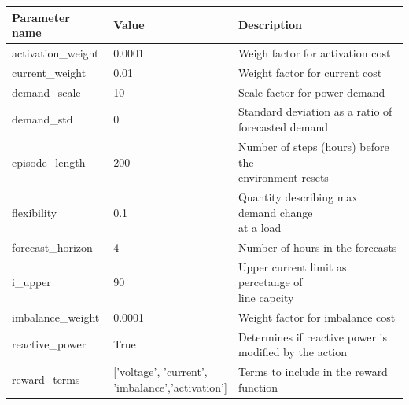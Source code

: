 \documentclass[class=book, crop=false]{standalone}
\begin{document}
{
\renewcommand{\arraystretch}{1.5}
\begin{table}[ht]
\center
\begin{tabular}{lll}
Parameter name     & Value                                                & Description                                                  \\
\hline
activation\_weight & 0.0001                                               & Weigh factor for activation cost                             \\
current\_weight    & 0.01                                                 & Weight factor for current cost                               \\
demand\_scale      & 10                                                   & Scale factor for power demand                                \\
demand\_std        & 0                                                    & \makecell[l]{Standard deviation as a ratio of \\ forecasted demand}           \\
episode\_length    & 200                                                  & \makecell[l]{Number of steps (hours) before the \\ environment resets}        \\
flexibility        & 0.1                                                  & \makecell[l]{Quantity describing  max demand change \\ at a load}              \\
forecast\_horizon  & 4                                                    & Number of hours in the forecasts                             \\
i\_upper           & 90                                                   & \makecell[l]{Upper current limit as percetange of \\line capcity}            \\
imbalance\_weight  & 0.0001                                               & Weight factor for imbalance cost                             \\
reactive\_power    & True                                                 & \makecell[l]{Determines if reactive power is \\ modified by the action}       \\
reward\_terms      & \makecell[l]{{[}’voltage’, ’current’,\\ ’imbalance’,’activation’{]}} & Terms to include in the reward function                      \\

\end{tabular}
\end{table}}
\end{document}
